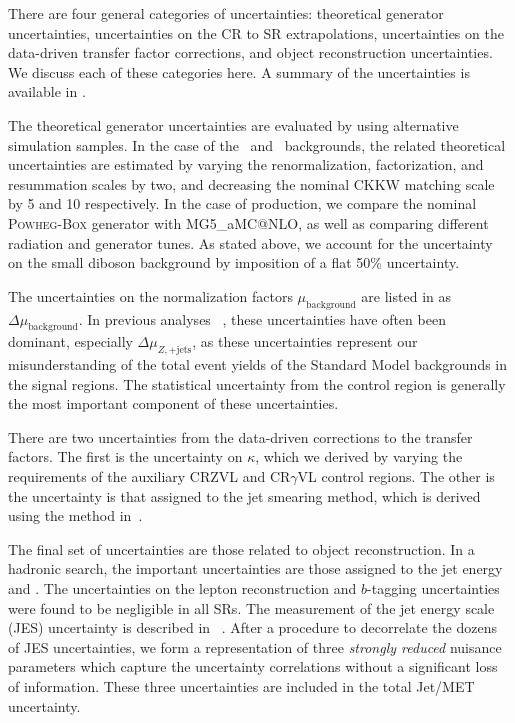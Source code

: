 There are four general categories of uncertainties: theoretical generator uncertainties, uncertainties on the CR to SR extrapolations, uncertainties on the data-driven transfer factor corrections, and object reconstruction uncertainties.
We discuss each of these categories here.
A summary of the uncertainties is available in .


The theoretical generator uncertainties are evaluated by using alternative simulation samples.
In the case of the \zjets~and \wjets~backgrounds, the related theoretical uncertainties are estimated by varying the renormalization, factorization, and resummation scales by two, and decreasing the nominal CKKW matching scale by 5 \GeV and 10 \GeV respectively.
In the case of \ttbar production, we compare the nominal \textsc{Powheg-Box} generator with MG5\_aMC@NLO, as well as comparing different radiation and generator tunes.
As stated above, we account for the uncertainty on the small diboson background by imposition of a flat 50\% uncertainty.

The uncertainties on the normalization factors $\mu_{\text{background}}$ are listed in  as $\Delta\mu_{\text{background}}$.
In previous analyses ~\cite{0-leptonPaper,0LPaper_13TeV}, these uncertainties have often been dominant, especially $\Delta\mu_{Z,\mathrm{+jets}}$, as these uncertainties represent our misunderstanding of the total event yields of the Standard Model backgrounds in the signal regions.
The statistical uncertainty from the control region is generally the most important component of these uncertainties.

There are two uncertainties from the data-driven corrections to the transfer factors.
The first is the uncertainty on $\kappa$, which we derived by varying the \met requirements of the auxiliary CRZVL and CR$\gamma$VL control regions.
The other is the uncertainty is that assigned to the jet smearing method, which is derived using the method in~\cite{SUSY-2011-20}.

The final set of uncertainties are those related to object reconstruction.
In a hadronic search, the important uncertainties are those assigned to the jet energy and \met.
The uncertainties on the lepton reconstruction and $b$-tagging uncertainties were found to be negligible in all SRs.
The measurement of the jet energy scale (JES) uncertainty is described in ~\cite{Aad:2011he,Aad:2012vm,ATL-PHYS-PUB-2015-014,ATL-PHYS-PUB-2015-015}.
After a procedure to decorrelate the dozens of JES uncertainties, we form a representation of three \textit{strongly reduced} nuisance parameters which capture the uncertainty correlations without a significant loss of information.
These three uncertainties are included in the total Jet/MET uncertainty.

